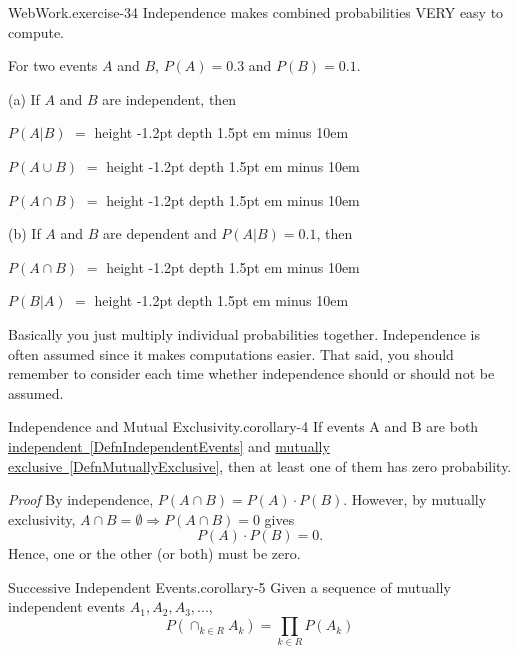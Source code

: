 \documentclass[10pt,]{book}
\makeatletter
\newcommand{\fillin}[1]{\leavevmode\leaders\vrule height -1.2pt depth 1.5pt \hskip #1em minus #1em \null}
\renewcommand*{\proofname}{Proof}
\renewenvironment{proof}[1][\proofname]{\par
  \pushQED{\qed}%
  \normalfont \topsep6\p@\@plus6\p@\relax
  \trivlist
  \item\relax
    {\itshape
    #1\@addpunct{.}}\hspace\labelsep\ignorespaces
}{%
  \popQED\endtrivlist\@endpefalse
}
\numberwithin{equation}{section}
\makeatother
\begin{document}
\begin{inlineexercise}{WebWork.}{exercise-34}%
\hypertarget{p-594}{}%
Independence makes combined probabilities VERY easy to compute.%
\par\medskip
\hypertarget{p-595}{}%
For two events \(A\) and \(B\), \(P(A) = 0.3\) and \(P(B) = 0.1\).%
\par
\hypertarget{p-596}{}%
(a)\(\) If \(A\) and \(B\) are independent, then%
\par
\hypertarget{p-597}{}%
\(P(A|B)\) \(=\)  \fillin{10}%
\par
\hypertarget{p-598}{}%
\(P(A \cup B)\) \(=\)  \fillin{10}%
\par
\hypertarget{p-599}{}%
\(P(A \cap B)\) \(=\)  \fillin{10}%
\par
\hypertarget{p-600}{}%
(b)\(\) If \(A\) and \(B\) are dependent and \(P(A|B) = 0.1\), then%
\par
\hypertarget{p-601}{}%
\(P(A \cap B)\) \(=\)  \fillin{10}%
\par
\hypertarget{p-602}{}%
\(P(B|A)\) \(=\)  \fillin{10}%
\par\medskip\noindent \hypertarget{p-603}{}%
Basically you just multiply individual probabilities together.  Independence is often assumed since it makes computations easier. That said, you should remember to consider each time whether independence should or should not be assumed.%
\par
\end{inlineexercise}
%
\par
\hypertarget{p-604}{}%
\begin{corollary}{Independence and Mutual Exclusivity.}{}{corollary-4}%
\hypertarget{p-605}{}%
If events A and B are both \hyperref[DefnIndependentEvents]{independent~\ref{DefnIndependentEvents}} and \hyperref[DefnMutuallyExclusive]{mutually exclusive~\ref{DefnMutuallyExclusive}}, then at least one of them has zero probability.%
\end{corollary}
\begin{proof}\hypertarget{proof-23}{}
\hypertarget{p-606}{}%
By independence, \(P(A \cap B) = P(A) \cdot P(B)\). However, by mutually exclusivity, \(A \cap B = \emptyset \Rightarrow P(A \cap B) = 0\) gives%
\begin{equation*}
P(A) \cdot P(B) = 0.
\end{equation*}
Hence, one or the other (or both) must be zero.%
\end{proof}
%
\par
\hypertarget{p-607}{}%
\begin{corollary}{Successive Independent Events.}{}{corollary-5}%
\hypertarget{p-608}{}%
Given a sequence of mutually independent events \(A_1, A_2, A_3, ...\),%
\begin{equation*}
P(\cap_{k \in R} A_k) = \prod_{k \in R} P(A_k)
\end{equation*}
%
\end{corollary}
%
%
%
\typeout{************************************************}
\typeout{************************************************}
%
\end{document}
